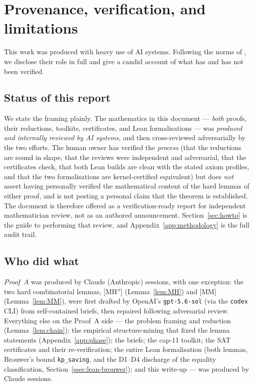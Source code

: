 \documentclass[11pt,reqno]{amsart}
\theoremstyle{definition}
\theoremstyle{remark}
\newcommand{\capeleven}{\textsf{cap-11}}
\begin{document}
\section{Provenance, verification, and limitations}\label{sec:provenance}

This work was produced with heavy use of AI systems. Following the norms of
\cite{Bloom617}, we disclose their role in full and give a candid account of what
has and has not been verified.

\subsection{Status of this report}
We state the framing plainly. The mathematics in this document --- \emph{both} proofs,
their reductions, toolkits, certificates, and Lean formalisations --- was
\emph{produced and internally reviewed by AI systems}, and then cross-reviewed
adversarially by the two efforts. The human owner has verified the \emph{process} (that
the reductions are sound in shape, that the reviews were independent and adversarial,
that the certificates check, that both Lean builds are clean with the stated axiom
profiles, and that the two formalisations are kernel-certified equivalent) but does
\emph{not} assert having personally verified the mathematical content of the hard lemmas
of either proof, and is not posting a personal claim that the theorem is established. The
document is therefore offered as a verification-ready report for independent
mathematician review, not as an authored announcement. Section~\ref{sec:howto} is the
guide to performing that review, and Appendix~\ref{app:methodology} is the full audit
trail.

\subsection{Who did what}
\emph{Proof~A} was produced by Claude (Anthropic) sessions, with one exception: the two
hard combinatorial lemmas, \textsf{[MH$''$]} (Lemma~\ref{lem:MH}) and \textsf{[MM]}
(Lemma~\ref{lem:MM}), were first drafted by OpenAI's \texttt{gpt-5.6-sol} (via the
\texttt{codex} CLI) from self-contained briefs, then repaired following adversarial
review. Everything else on the Proof~A side --- the problem framing and reduction
(Lemma~\ref{lem:chain}); the empirical structure-mining that fixed the lemma statements
(Appendix~\ref{app:phase}); the briefs; the \capeleven{} toolkit; the SAT certificates
and their re-verification; the entire Lean formalisation (both lemmas, Brouwer's bound
\texttt{kp\_saving}, and the D1--D4 discharge of the equality classification,
Section~\ref{ssec:lean-brouwer}); and this write-up --- was produced by Claude sessions.
\end{document}
